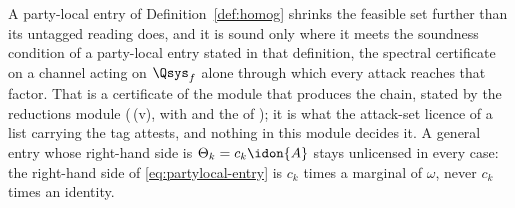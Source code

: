 
\begin{remark}\label{rem:party-local-soundness}
A party-local entry of Definition~\ref{def:homog} shrinks the feasible set
further than its untagged reading does, and it is sound only where it meets
the soundness condition of a party-local entry stated in that definition, the
spectral certificate on a channel acting on $\Qsys_f$ alone through which
every attack reaches that factor. That is a certificate of the module that produces the chain,
stated by the reductions module (\,(v), with
 and the  of
); it is what the attack-set licence of a list
carrying the tag attests, and nothing in this module decides it. A general
entry whose right-hand side is $\Theta_k=c_k\idon{A}$ stays unlicensed in
every case: the right-hand side of \eqref{eq:partylocal-entry} is $c_k$
times a marginal of $\omega$, never $c_k$ times an identity.
\end{remark}

